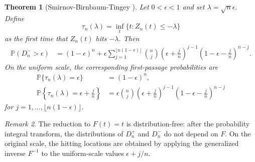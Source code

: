 \documentclass[12pt]{article}
\newtheorem{theorem}{Theorem}
\theoremstyle{remark}
\newtheorem{remark}[theorem]{Remark}
\begin{document}
\begin{theorem}[Smirnov-Birnbaum-Tingey \cite{birnbaum1951one}]
Let $0<\epsilon<1$ and set $\lambda=\sqrt{n}\epsilon$. Define
\[
\tau_n(\lambda)=\inf_t\{t:Z_n(t)\le-\lambda\}
\]
as the first time that $Z_n(t)$ hits $-\lambda$. Then
\begin{align}
    \mathbb{P}\left(D_n^->\epsilon\right)
    &=(1-\epsilon)^n+\epsilon\sum_{j=1}^{\lfloor n(1-\epsilon)\rfloor}\binom{n}{j}
    \left(\epsilon+\frac{j}{n}\right)^{j-1}
    \left(1-\epsilon-\frac{j}{n}\right)^{n-j}.
\end{align}
On the uniform scale, the corresponding first-passage probabilities are
\begin{align}
    \mathbb{P}\{\tau_n(\lambda)=\epsilon\}
    &=(1-\epsilon)^n,\\
    \mathbb{P}\left\{\tau_n(\lambda)=\epsilon+\frac{j}{n}\right\}
    &=\epsilon\binom{n}{j}\left(\epsilon+\frac{j}{n}\right)^{j-1}
    \left(1-\epsilon-\frac{j}{n}\right)^{n-j}
\end{align}
for $j=1,\ldots,\lfloor n(1-\epsilon)\rfloor$.
\end{theorem}

\begin{remark}
The reduction to $F(t)=t$ is distribution-free: after the probability integral transform, the distributions of $D_n^+$ and $D_n^-$ do not depend on $F$. On the original scale, the hitting locations are obtained by applying the generalized inverse $F^{-1}$ to the uniform-scale values $\epsilon+j/n$.
\end{remark}
\end{document}
